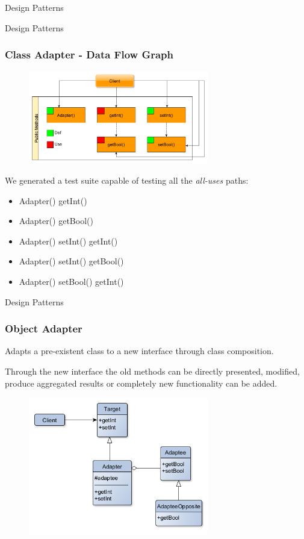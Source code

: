 \documentclass{beamer}
\begin{document}
\begin{section}{Design Patterns}
	\begin{subsection}{Design Patterns}
		\begin{frame}
			\frametitle{Class Adapter - Data Flow Graph}
	\begin{figure}[h]
		\centering
		\includegraphics[width=0.7\textwidth]{./Adapter/Class/CallGraph.png}	
		\label{CAdataflow}
	\end{figure}
	
\vspace{5mm}
{\footnotesize 	We generated a test suite capable of testing all the \textit{all-uses} paths:
	\begin{itemize}
		\item Adapter() getInt() 
		\item Adapter() getBool() 
		\item Adapter() setInt() getInt() 
		\item Adapter() setInt() getBool() 
		\item Adapter() setBool() getInt()
		\newline
	\end{itemize}}

\end{frame}
\end{subsection}

	\begin{subsection}{Design Patterns}
		\begin{frame}
			\frametitle{Object Adapter}
Adapts a pre-existent class to a new interface through class composition. 

{\small Through the new interface the old methods can be directly presented, modified, produce aggregated results or completely new functionality can be added.}			

\begin{figure}[!h]
	\centering
	\includegraphics[width=0.7\textwidth]{./Adapter/Object/ClassDiagram.png}	
	\label{OAclassDiag}
\end{figure} 
			

\end{frame}
\end{subsection}
\end{section}
\end{document}

